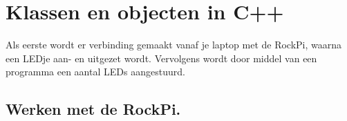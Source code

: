 \chapter{Klassen en objecten in C++} \label{chap:klas}
Als eerste wordt er verbinding gemaakt vanaf je laptop met de RockPi, waarna een LEDje aan- en uitgezet wordt. Vervolgens wordt door middel van een programma een aantal LEDs aangestuurd.

\section{Werken met de RockPi.}

